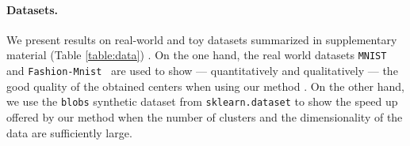 \paragraph{Datasets.}
We present results on real-world and toy datasets summarized in supplementary material (Table \ref{table:data}) . On the one hand, the real world datasets \texttt{MNIST}~\cite{lecun-mnisthandwrittendigit-2010} and \texttt{Fashion-Mnist}~\cite{Pedregosa2011Scikit} %
are used to show --- quantitatively and qualitatively --- the good quality of the obtained centers when using our method \qkmeans. On the other hand, we use the \texttt{blobs} synthetic dataset from \texttt{sklearn.dataset} to show the speed up offered by our method \qkmeans when the number of clusters and the dimensionality of the data are sufficiently large.


